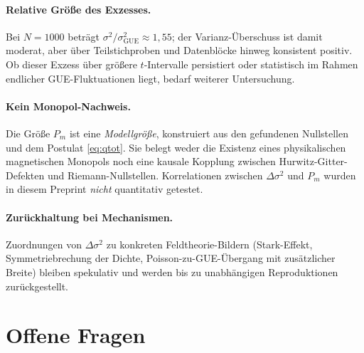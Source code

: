 \documentclass[11pt,a4paper]{article}
\begin{document}
\paragraph{Relative Größe des Exzesses.}
Bei $N=1000$ beträgt $\sigma^2/\sigma^2_{\mathrm{GUE}} \approx 1{,}55$;
der Varianz-Überschuss ist damit moderat, aber über Teilstichproben und
Datenblöcke hinweg konsistent positiv. Ob dieser Exzess über größere $t$-Intervalle
persistiert oder statistisch im Rahmen endlicher GUE-Fluktuationen liegt,
bedarf weiterer Untersuchung.

\paragraph{Kein Monopol-Nachweis.}
Die Größe $P_m$ ist eine \emph{Modellgröße}, konstruiert aus den gefundenen
Nullstellen und dem Postulat \eqref{eq:qtot}. Sie belegt weder die Existenz
eines physikalischen magnetischen Monopols noch eine kausale Kopplung zwischen
Hurwitz-Gitter-Defekten und Riemann-Nullstellen. Korrelationen zwischen
$\Delta\sigma^2$ und $P_m$ wurden in diesem Preprint \emph{nicht} quantitativ
getestet.

\paragraph{Zurückhaltung bei Mechanismen.}
Zuordnungen von $\Delta\sigma^2$ zu konkreten Feldtheorie-Bildern
(Stark-Effekt, Symmetriebrechung der Dichte, Poisson-zu-GUE-Übergang mit
zusätzlicher Breite) bleiben spekulativ und werden bis zu unabhängigen
Reproduktionen zurückgestellt.

\section{Offene Fragen}
\label{sec:offene-fragen}
\end{document}
